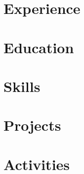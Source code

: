 \documentclass{article}
\begin{document}
\setlength{\footskip}{3.60004pt}


\vspace{0.5cm}
\section{Experience}


\section{Education}


\vspace{0.3cm}
\section{Skills}


\section{Projects}


\section{Activities}

\end{document}
